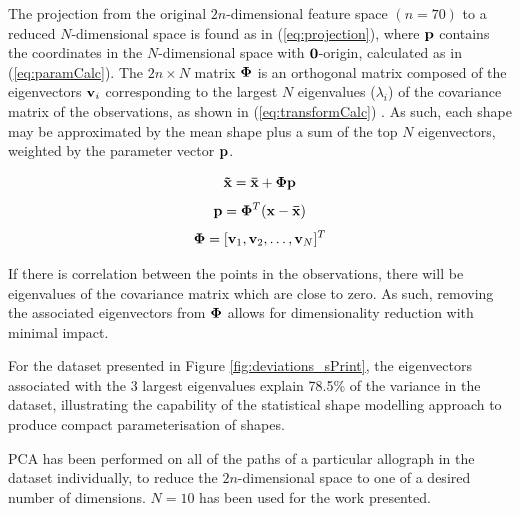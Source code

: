 \documentclass{sig-alternate}
\begin{document}
The projection from the original $2n$-dimensional feature space $(n=70)$ to a reduced
$N$-dimensional space is found as in (\ref{eq:projection}), where ${\bf p}$
contains the coordinates in the $N$-dimensional space with ${\bf 0}$-origin,
calculated as in (\ref{eq:paramCalc}). The $2n\times N$ matrix ${\bf \Phi }$ is
an orthogonal matrix composed of the eigenvectors ${\bf v}_i$ corresponding to
the largest $N$ eigenvalues ($\lambda_i$) of the covariance matrix of the
observations, as shown in (\ref{eq:transformCalc}) \cite{Stegmann2002}. As such,
each shape may be approximated by the mean shape plus a sum of the top $N$
eigenvectors, weighted by the parameter vector ${\bf p}$. 

\begin{equation}\label{eq:projection}
{\bf \tilde{x}=\bar{x}+\Phi p}
\end{equation}
\begin{equation}\label{eq:paramCalc}
{\bf p} ={\bf \Phi}^T ({\bf {x}-\bar{x}})
\end{equation}
\begin{equation}\label{eq:transformCalc}
{\bf \Phi} = [{\bf v}_1, {\bf v}_2, \ldots, {\bf v}_N]^T
\end{equation}

If there is correlation between the points in the observations, there will be
eigenvalues of the covariance matrix which are close to zero. As such, removing
the associated eigenvectors from ${\bf \Phi}$ allows for dimensionality
reduction with minimal impact. 
%

For the dataset presented in Figure \ref{fig:deviations_sPrint}, the
eigenvectors associated with the 3 largest eigenvalues explain 78.5\% of the
variance in the dataset, illustrating the capability of the statistical shape
modelling approach to produce compact parameterisation of shapes. 

%
%
PCA has been performed on all of the paths of a particular allograph in the
dataset individually, to reduce the $2n$-dimensional space to one of a desired
number of dimensions. $N=10$ has been used for the work presented.
\end{document}
